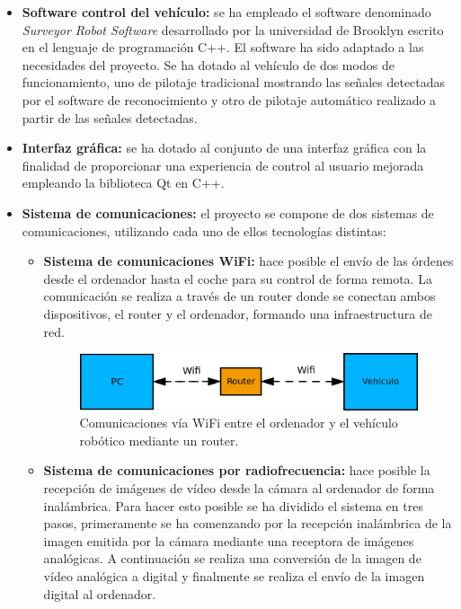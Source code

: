 \documentclass[a4paper,12pt]{article}
\begin{document}
\begin{itemize}
\item \textbf{Software control del vehículo:} se ha empleado el software denominado \emph{Surveyor Robot Software} desarrollado por la universidad de Brooklyn escrito en el lenguaje de programación C++. El software ha sido adaptado a las necesidades del proyecto. Se ha dotado al vehículo de dos modos de funcionamiento, uno de pilotaje tradicional mostrando las señales detectadas por el software de reconocimiento y otro de pilotaje automático realizado a partir de las señales detectadas.

\item \textbf{Interfaz gráfica:} se ha dotado al conjunto de una interfaz gráfica con la finalidad de proporcionar una experiencia de control al usuario mejorada empleando la biblioteca Qt en C++.

\item \textbf{Sistema de comunicaciones:} el proyecto se compone de dos sistemas de comunicaciones, utilizando cada uno de ellos tecnologías distintas:

\begin{itemize}
\item \textbf{Sistema de comunicaciones WiFi:} hace posible el envío de las órdenes desde el ordenador hasta el coche para su control de forma remota. La comunicación se realiza a través de un router donde se conectan ambos dispositivos, el router y el ordenador, formando una infraestructura de red.

\begin{figure}[H]
  \begin{center}
    \includegraphics[scale=0.8]{imagenes/comunicacion-coche-robot.png}
  \end{center}
  \caption{Comunicaciones vía WiFi entre el ordenador y el vehículo robótico mediante un router.}
  \label{fig:com-coche-pc}
\end{figure}

\item  \textbf{Sistema de comunicaciones por radiofrecuencia:} hace posible la recepción de imágenes de vídeo desde la cámara al ordenador de forma inalámbrica. Para hacer esto posible se ha dividido el sistema en tres pasos, primeramente se ha comenzando por la recepción inalámbrica de la imagen emitida por la cámara mediante una receptora de imágenes analógicas. A continuación se realiza una conversión de la imagen de vídeo analógica a digital y finalmente se realiza el envío de la imagen digital al ordenador.


\end{itemize}
\end{itemize}
\end{document}
